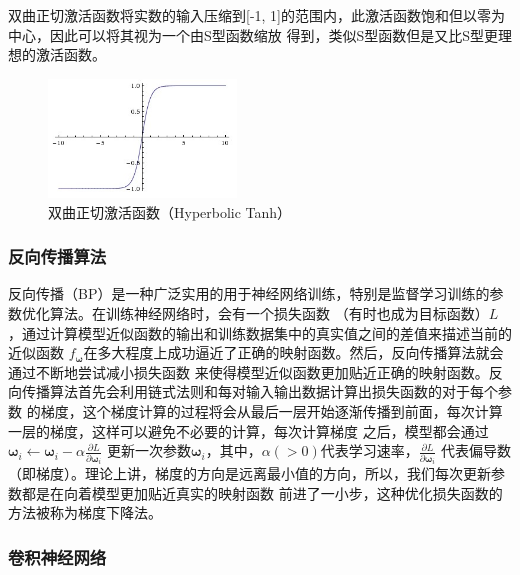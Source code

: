 \documentclass[supercite]{HustGraduPaper}
\theoremstyle{definition}
\begin{document}
\begin{itemize}
  双曲正切激活函数将实数的输入压缩到[-1, 1]的范围内，此激活函数饱和但以零为中心，因此可以将其视为一个由S型函数缩放
  得到，类似S型函数但是又比S型更理想的激活函数。
  \begin{figure}[H]
      \begin{center}
      \includegraphics[width=5cm]{images/tanh}
      \end{center}
      \caption{双曲正切激活函数（Hyperbolic Tanh）}
      \label{fig:tanh}
  \end{figure}
\end{itemize}

\subsubsection{反向传播算法}

反向传播（BP）是一种广泛实用的用于神经网络训练，特别是监督学习训练的参数优化算法。在训练神经网络时，会有一个损失函数
（有时也成为目标函数）$L$，通过计算模型近似函数的输出和训练数据集中的真实值之间的差值来描述当前的近似函数
$f_{\boldsymbol{\omega}}$在多大程度上成功逼近了正确的映射函数。然后，反向传播算法就会通过不断地尝试减小损失函数
来使得模型近似函数更加贴近正确的映射函数。反向传播算法首先会利用链式法则和每对输入输出数据计算出损失函数的对于每个参数
的梯度，这个梯度计算的过程将会从最后一层开始逐渐传播到前面，每次计算一层的梯度，这样可以避免不必要的计算，每次计算梯度
之后，模型都会通过
$\boldsymbol{\omega}_{i} \leftarrow \boldsymbol{\omega}_{i}-\alpha \frac{\partial L}{\partial \boldsymbol{\omega}_{i}}$
更新一次参数${\boldsymbol{\omega}_{i}}$，其中，$\alpha(>0)$代表学习速率，$\frac{\partial L}{\partial \boldsymbol{\omega}_{i}}$
代表偏导数（即梯度）。理论上讲，梯度的方向是远离最小值的方向，所以，我们每次更新参数都是在向着模型更加贴近真实的映射函数
前进了一小步，这种优化损失函数的方法被称为梯度下降法。

\subsubsection{卷积神经网络}
\end{document}
